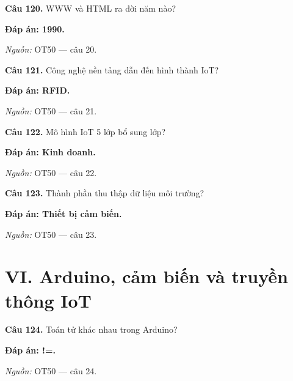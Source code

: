 \documentclass[11pt,a4paper]{article}
\begin{document}
\textbf{Câu 120.} WWW và HTML ra đời năm nào?\par
{\color{answer}\textbf{Đáp án: 1990.}}\par
{\footnotesize\color{sourcegray}\textit{Nguồn:} OT50 — câu 20.\par}
\vspace{3pt}\par\noindent{\color{black!18}\rule{\linewidth}{0.3pt}}\par\medskip

\textbf{Câu 121.} Công nghệ nền tảng dẫn đến hình thành IoT?\par
{\color{answer}\textbf{Đáp án: RFID.}}\par
{\footnotesize\color{sourcegray}\textit{Nguồn:} OT50 — câu 21.\par}
\vspace{3pt}\par\noindent{\color{black!18}\rule{\linewidth}{0.3pt}}\par\medskip

\textbf{Câu 122.} Mô hình IoT 5 lớp bổ sung lớp?\par
{\color{answer}\textbf{Đáp án: Kinh doanh.}}\par
{\footnotesize\color{sourcegray}\textit{Nguồn:} OT50 — câu 22.\par}
\vspace{3pt}\par\noindent{\color{black!18}\rule{\linewidth}{0.3pt}}\par\medskip

\textbf{Câu 123.} Thành phần thu thập dữ liệu môi trường?\par
{\color{answer}\textbf{Đáp án: Thiết bị cảm biến.}}\par
{\footnotesize\color{sourcegray}\textit{Nguồn:} OT50 — câu 23.\par}
\vspace{3pt}\par\noindent{\color{black!18}\rule{\linewidth}{0.3pt}}\par\medskip

\section*{VI. Arduino, cảm biến và truyền thông IoT}

\textbf{Câu 124.} Toán tử khác nhau trong Arduino?\par
{\color{answer}\textbf{Đáp án: !=.}}\par
{\footnotesize\color{sourcegray}\textit{Nguồn:} OT50 — câu 24.\par}
\vspace{3pt}\par\noindent{\color{black!18}\rule{\linewidth}{0.3pt}}\par\medskip
\end{document}
